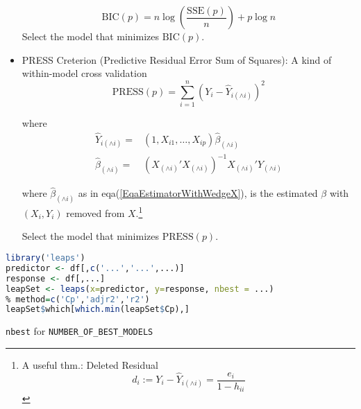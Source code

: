 \begin{itemize}[topsep=2pt,itemsep=2pt]
        \[
            \mathrm{BIC}(p)=n\log\left(\dfrac{\mathrm{SSE}(p) }{n}\right)+p\log n
        \]
        Select the model that minimizes $ \mathrm{BIC}(p) $.
        
        \item PRESS Creterion (Predictive Residual Error Sum of Squares): A kind of within-model cross validation
        \[
            \mathrm{PRESS}(p)=\sum_{i=1}^n(Y_i-\hat{Y}_{i(\wedge i)})^2 
        \]
        
        where 
        \begin{align*}
            \hat{Y}_{i(\wedge i)}=&(1,X_{i1},\ldots,X_{ip})\hat{\beta }_{(\wedge i)}\\
            \hat{\beta }_{(\wedge i)}=&(X_{(\wedge i)}'X_{(\wedge i)})^{-1}X_{(\wedge i)}'Y_{(\wedge i)}
        \end{align*}
        
        where $ \hat{\beta }_{(\wedge i)} $ as in eqa(\ref{EqaEstimatorWithWedgeX}), is the estimated $ \beta  $ with $ (X_i,Y_i) $ removed from $ X $.\footnote{A useful thm.: Deleted Residual
        \[
            d_i:=Y_i-\hat{Y}_{i(\wedge i)}=\dfrac{e_i}{1-h_{ii}} 
        \]
        
        }
            
        Select the model that minimizes $ \mathrm{PRESS}(p) $.

        
        
        
        \end{itemize}
\begin{rcode}
\begin{lstlisting}[language=R]
library('leaps')
predictor <- df[,c('...','...',...)]
response <- df[,...]
leapSet <- leaps(x=predictor, y=response, nbest = ...)
% method=c('Cp','adjr2','r2')
leapSet$which[which.min(leapSet$Cp),]
\end{lstlisting}
    
    \lstinline|nbest| for \lstinline|NUMBER_OF_BEST_MODELS|
\end{rcode}





















